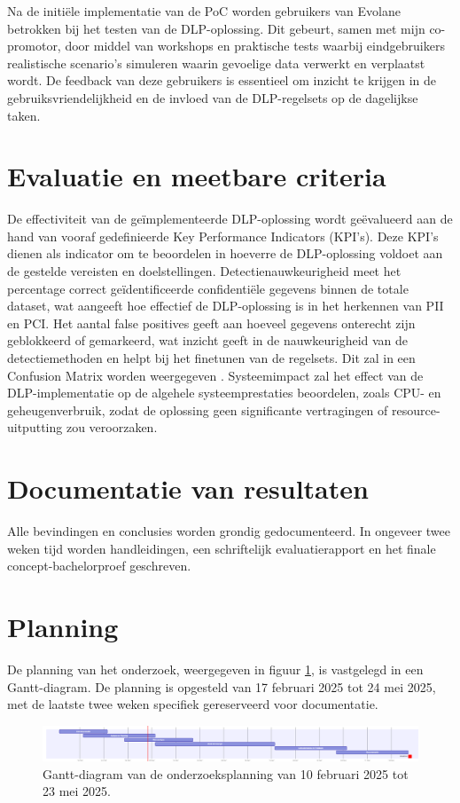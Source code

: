 Na de initiële implementatie van de PoC worden gebruikers van Evolane betrokken bij het testen van de DLP-oplossing. 
Dit gebeurt, samen met mijn co-promotor, door middel van workshops en praktische tests waarbij eindgebruikers realistische scenario's simuleren waarin gevoelige data verwerkt en verplaatst wordt. 
De feedback van deze gebruikers is essentieel om inzicht te krijgen in de gebruiksvriendelijkheid en de invloed van de DLP-regelsets op de dagelijkse taken. 

\section{Evaluatie en meetbare criteria}%

De effectiviteit van de geïmplementeerde DLP-oplossing wordt geëvalueerd aan de hand van vooraf gedefinieerde Key Performance Indicators (KPI's). 
Deze KPI's dienen als indicator om te beoordelen in hoeverre de DLP-oplossing voldoet aan de gestelde vereisten en doelstellingen.
Detectienauwkeurigheid meet het percentage correct geïdentificeerde confidentiële gegevens binnen de totale dataset, 
wat aangeeft hoe effectief de DLP-oplossing is in het herkennen van PII en PCI. 
Het aantal false positives geeft aan hoeveel gegevens onterecht zijn geblokkeerd of gemarkeerd, 
wat inzicht geeft in de nauwkeurigheid van de detectiemethoden en helpt bij het finetunen van de regelsets. 
Dit zal in een Confusion Matrix worden weergegeven \autocite{Microsoftn.d.}.
Systeemimpact zal het effect van de DLP-implementatie op de algehele systeemprestaties beoordelen, zoals CPU- en 
geheugenverbruik, zodat de oplossing geen significante vertragingen of resource-uitputting zou veroorzaken.

\section{Documentatie van resultaten}%

Alle bevindingen en conclusies worden grondig gedocumenteerd. 
In ongeveer twee weken tijd worden handleidingen, een schriftelijk evaluatierapport en het finale concept-bachelorproef geschreven.

\section{Planning}%
\label{sec:planning}

De planning van het onderzoek, weergegeven in figuur \ref{fig:gantBP}, is vastgelegd in een Gantt-diagram. De planning is opgesteld van 17 februari 2025 tot 24 mei 2025, met de laatste twee weken specifiek gereserveerd voor documentatie.

\begin{figure}
  \centering
  \includegraphics[scale=0.50]
  {img/ganttupdate.png}
  \caption{\label{fig:gantBP}Gantt-diagram van de onderzoeksplanning van 10 februari 2025 tot 23 mei 2025.}
\end{figure}
